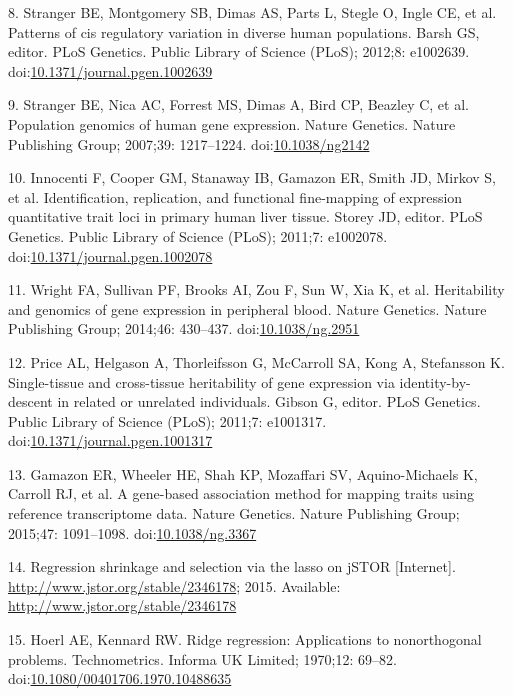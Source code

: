 \documentclass[]{article}
\begin{document}
8. Stranger BE, Montgomery SB, Dimas AS, Parts L, Stegle O, Ingle CE, et
al. Patterns of cis regulatory variation in diverse human populations.
Barsh GS, editor. PLoS Genetics. Public Library of Science (PLoS);
2012;8: e1002639.
doi:\href{http://dx.doi.org/10.1371/journal.pgen.1002639}{10.1371/journal.pgen.1002639}

9. Stranger BE, Nica AC, Forrest MS, Dimas A, Bird CP, Beazley C, et al.
Population genomics of human gene expression. Nature Genetics. Nature
Publishing Group; 2007;39: 1217--1224.
doi:\href{http://dx.doi.org/10.1038/ng2142}{10.1038/ng2142}

10. Innocenti F, Cooper GM, Stanaway IB, Gamazon ER, Smith JD, Mirkov S,
et al. Identification, replication, and functional fine-mapping of
expression quantitative trait loci in primary human liver tissue. Storey
JD, editor. PLoS Genetics. Public Library of Science (PLoS); 2011;7:
e1002078.
doi:\href{http://dx.doi.org/10.1371/journal.pgen.1002078}{10.1371/journal.pgen.1002078}

11. Wright FA, Sullivan PF, Brooks AI, Zou F, Sun W, Xia K, et al.
Heritability and genomics of gene expression in peripheral blood. Nature
Genetics. Nature Publishing Group; 2014;46: 430--437.
doi:\href{http://dx.doi.org/10.1038/ng.2951}{10.1038/ng.2951}

12. Price AL, Helgason A, Thorleifsson G, McCarroll SA, Kong A,
Stefansson K. Single-tissue and cross-tissue heritability of gene
expression via identity-by-descent in related or unrelated individuals.
Gibson G, editor. PLoS Genetics. Public Library of Science (PLoS);
2011;7: e1001317.
doi:\href{http://dx.doi.org/10.1371/journal.pgen.1001317}{10.1371/journal.pgen.1001317}

13. Gamazon ER, Wheeler HE, Shah KP, Mozaffari SV, Aquino-Michaels K,
Carroll RJ, et al. A gene-based association method for mapping traits
using reference transcriptome data. Nature Genetics. Nature Publishing
Group; 2015;47: 1091--1098.
doi:\href{http://dx.doi.org/10.1038/ng.3367}{10.1038/ng.3367}

14. Regression shrinkage and selection via the lasso on jSTOR
{[}Internet{]}. \url{http://www.jstor.org/stable/2346178}; 2015.
Available: \url{http://www.jstor.org/stable/2346178}

15. Hoerl AE, Kennard RW. Ridge regression: Applications to
nonorthogonal problems. Technometrics. Informa UK Limited; 1970;12:
69--82.
doi:\href{http://dx.doi.org/10.1080/00401706.1970.10488635}{10.1080/00401706.1970.10488635}
\end{document}
